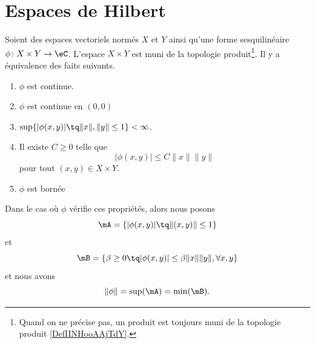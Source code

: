 
\section{Espaces de Hilbert}


\begin{proposition}      \label{PROPooQFTSooPFfbCc}
	Soient des espaces vectoriels normés \( X\) et \( Y\) ainsi qu'une forme sesquilinéaire \( \phi\colon X\times Y\to \eC\). L'espace \( X\times Y\) est muni de la topologie produit\footnote{Quand on ne précise pas, un produit est toujours muni de la topologie produit \ref{DefIINHooAAjTdY}.}. Il y a équivalence des faits suivants.
	\begin{enumerate}
		\item       \label{ITEMooWMFBooOWPzgP}
		      \( \phi\) est continue.
		\item       \label{ITEMooSFQZooHNcWwH}
		      \( \phi\) est continue en \( (0,0)\)
		\item     \label{ITEMooWSWQooSYzOol}
		      \( \sup\{ | \phi(x,y) |\tq \| x \|, \| y \|\leq 1 \}<\infty\).
		\item       \label{ITEMooRKHQooMVXlYD}
		      Il existe \( C\geq 0\) telle que
		      \begin{equation}
			      | \phi(x,y) |\leq C\| x \|\| y \|
		      \end{equation}
		      pour tout \( (x,y)\in X\times Y\).
		\item       \label{ITEMooLWDCooLIGVDs}
		      \( \phi\) est bornée
	\end{enumerate}
	Dans le cas où \( \phi\) vérifie ces propriétés, alors nous posons
	\begin{equation}
		\mA=\{ | \phi(x,y) |\tq\| (x,y) \|\leq 1 \}
	\end{equation}
	et
	\begin{equation}
		\mB=\{ \beta\geq 0\tq | \phi(x,y) |\leq \beta\| x \|\| y \|,\forall x,y \}
	\end{equation}
	et nous avons
	\begin{equation}
		\| \phi \|=\sup(\mA)=\min(\mB).
	\end{equation}
\end{proposition}


